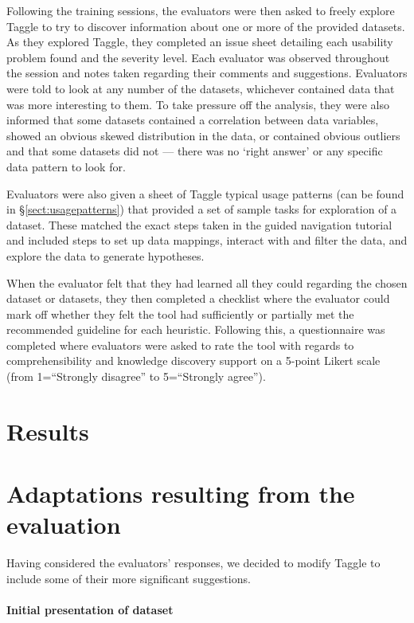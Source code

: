 Following the training sessions, the evaluators were then asked to freely explore Taggle to try to discover information about one or more of the provided datasets. As they explored Taggle, they completed an issue sheet detailing each usability problem found and the severity level. Each evaluator was observed throughout the session and notes taken regarding their comments and suggestions. Evaluators were told to look at any number of the datasets, whichever contained data that was more interesting to them. To take pressure off the analysis, they were also informed that some datasets contained a correlation between data variables, showed an obvious skewed distribution in the data, or contained obvious outliers and that some datasets did not --- there was no `right answer' or any specific data pattern to look for.

Evaluators were also given a sheet of Taggle typical usage patterns (can be found in \S\ref{sect:usagepatterns}) that provided a set of sample tasks for exploration of a dataset. These matched the exact steps taken in the guided navigation tutorial and included steps to set up data mappings, interact with and filter the data, and explore the data to generate hypotheses.

When the evaluator felt that they had learned all they could regarding the chosen dataset or datasets, they then completed a checklist where the evaluator could mark off whether they felt the tool had sufficiently or partially met the recommended guideline for each heuristic. Following this, a questionnaire was completed where evaluators were asked to rate the tool with regards to comprehensibility and knowledge discovery support on a 5-point Likert scale (from 1=``Strongly disagree'' to 5=``Strongly agree'').

\section{Results}\label{sect:heuristicevalresults}


\section{Adaptations resulting from the evaluation}\label{sect:heuristicadaptations}

Having considered the evaluators' responses, we decided to modify Taggle to include some of their more significant suggestions.

\paragraph{Initial presentation of dataset}

